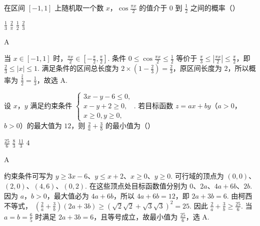 \begin{problem}
在区间 \([-1, 1]\) 上随机取一个数 \(x\)，\(\cos \frac{\pi x}{2}\) 的值介于 \(0\) 到 \(\frac{1}{2}\) 之间的概率（\quad）

\choices
    {\(\frac{1}{3}\)}
    {\(\frac{2}{\pi}\)}
    {\(\frac{1}{2}\)}
    {\( \frac{2}{3} \)}
\end{problem}

\begin{answer}
A
\end{answer}

\begin{solution}
当 \(x\in[-1,1]\) 时，\(\frac{\pi x}{2}\in[-\frac\pi2,\frac\pi2]\). 条件 \(0\leqslant\cos\frac{\pi x}{2}\leqslant\frac12\) 等价于 \(\frac\pi3\leqslant\left|\frac{\pi x}{2}\right|\leqslant\frac\pi2\)，即 \(\frac23\leqslant|x|\leqslant1\). 满足条件的区间总长度为 \(2\times(1-\frac23)=\frac23\)，原区间长度为 \(2\)，所以概率为 \(\frac{\frac{2}{3}}{2}=\frac13\)，故选 A.
\end{solution}

\begin{problem}
设 \(x\)，\(y\) 满足约束条件 \(\begin{cases}
3x - y - 6 \leqslant 0,\\
x - y + 2 \geqslant 0,\\
x \geqslant 0, y \geqslant 0,
\end{cases}\). 若目标函数 \(z = ax + by\)（\(a > 0\)，\(b > 0\)）的最大值为 \(12\)，则 \(\frac{2}{a} + \frac{3}{b}\) 的最小值为（\quad）

\choices
    {\(\frac{25}{6}\)}
    {\(\frac{8}{3}\)}
    {\(\frac{11}{3}\)}
    {\(4\)}
\end{problem}

\begin{answer}
A
\end{answer}

\begin{solution}
约束条件可写为 \(y\geqslant3x-6\)、\(y\leqslant x+2\)、\(x\geqslant0\)、\(y\geqslant0\). 可行域的顶点为 \((0,0)\)、\((2,0)\)、\((4,6)\)、\((0,2)\). 在这些顶点处目标函数值分别为 \(0\)、\(2a\)、\(4a+6b\)、\(2b\). 因为 \(a\)，\(b>0\)，最大值必为 \(4a+6b\)，所以 \(4a+6b=12\)，即 \(2a+3b=6\). 由柯西不等式，
\(\displaystyle \left(\frac2a+\frac3b\right)(2a+3b)\geqslant(\sqrt2\sqrt2+\sqrt3\sqrt3)^2=25\).
因此 \(\frac2a+\frac3b\geqslant\frac{25}{6}\). 当 \(a=b=\frac65\) 时满足 \(2a+3b=6\)，且等号成立，故最小值为 \(\frac{25}{6}\)，选 A.
\end{solution}

